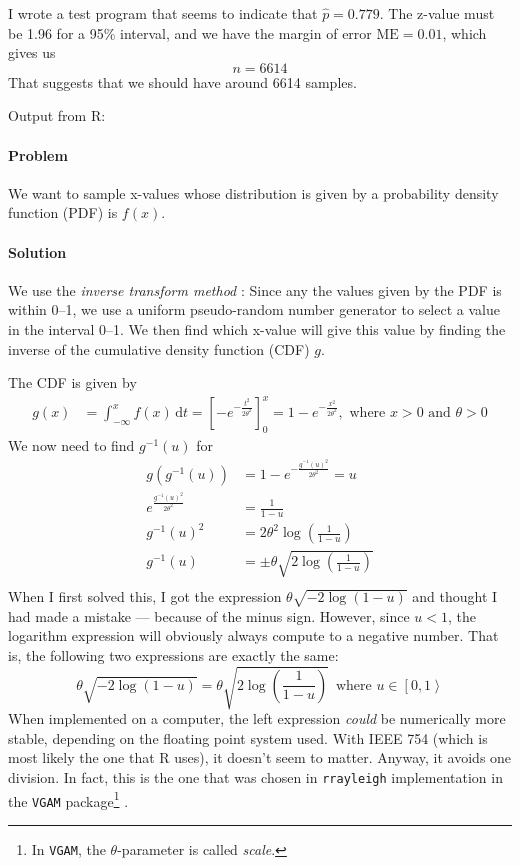 \documentclass[a4paper,english,12pt]{article}
\begin{document}
I wrote a test program that seems to indicate that $\hat{p} = 0.779$. The
z-value must be 1.96 for a 95\%{} interval, and we have the margin of error
$\text{ME} = 0.01$, which gives us
\[
  n = 6614
\]
That suggests that we should have around 6614 samples.

Output from R:

\paragraph{Problem} We want to sample x-values whose distribution is given by a
probability density function (PDF) is $f(x)$.

\paragraph{Solution} We use the \textit{inverse transform method}
\cite{wiki:inverse.transform.method}: Since any the values given by the PDF is
within 0--1, we use a uniform pseudo-random number generator to select a value
in the interval 0--1. We then find which x-value will give this value by
finding the inverse of the cumulative density function (CDF) $g$.

The CDF is given by
\begin{align*}
  g(x) & = \int_{-\infty}^{x} f(x)\, \mathrm{d}t 
     = \left[ -e^{-\frac{t^2}{2\theta^2}} \right]_0^{x} = 
     1 - e^{-\frac{x^2}{2\theta^2}}, \text{ where } x>0 \text{ and } \theta > 0
\end{align*}
We now need to find $g^{-1}(u)$ for
\begin{align*}
  g(g^{-1}(u)) &= 1 - e^{-\frac{g^{-1}(u)^2}{2\theta^2}} = u \\
   e^\frac{g^{-1}(u)^2}{2\theta^2}  &= \frac{1}{1 - u} \\
   g^{-1}(u)^2  &= 2\theta^2\log{\left(\frac{1}{1 - u}\right)} \\
   g^{-1}(u)  &= \pm\theta\sqrt{2\log{\left(\frac{1}{1 - u}\right)}} \\
\end{align*}
When I first solved this, I got the expression $\theta\sqrt{-2\log{(1-u)}}$ and
thought I had made a mistake --- because of the minus sign. However, since
$u<1$, the logarithm expression will obviously always compute to a negative
number. That is, the following two expressions are exactly the same:
\[
  \theta\sqrt{-2\log{(1-u)}} = \theta\sqrt{2\log{\left(\frac{1}{1-u}\right)}}\,
  \text{ where } u \in \left[0,1\right>
\]
When implemented on a computer, the left expression \textit{could} be
numerically more stable, depending on the floating point system used. With IEEE
754 (which is most likely the one that R uses), it doesn't seem to matter.
Anyway, it avoids one division. In fact, this is the one that was chosen in
\texttt{rrayleigh} implementation in the \texttt{VGAM} package\footnote{In
\texttt{VGAM}, the $\theta$-parameter is called \textit{scale}.}
\cite{github:vgam}.
\end{document}
